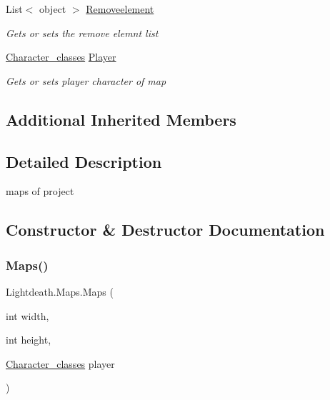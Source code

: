 \begin{DoxyCompactItemize}
List$<$ object $>$ \hyperlink{class_lightdeath_1_1_maps_af90bc1c0410dbcade8f89717f0eb478e}{Removeelement}
\begin{DoxyCompactList}\small\item\em Gets or sets the remove elemnt list \end{DoxyCompactList}\item 
\hyperlink{class_lightdeath_1_1_character__classes}{Character\+\_\+classes} \hyperlink{class_lightdeath_1_1_maps_adb2618cdaa5a0ceb621b59d963956c9d}{Player}
\begin{DoxyCompactList}\small\item\em Gets or sets player character of map \end{DoxyCompactList}\end{DoxyCompactItemize}
\subsection*{Additional Inherited Members}


\subsection{Detailed Description}
maps of project 



\subsection{Constructor \& Destructor Documentation}
\hypertarget{class_lightdeath_1_1_maps_af78c0e7d26d9d5b0ea32475e36a6ccc0}{}\label{class_lightdeath_1_1_maps_af78c0e7d26d9d5b0ea32475e36a6ccc0} 
\subsubsection{\texorpdfstring{Maps()}{Maps()}}
{\footnotesize\ttfamily Lightdeath.\+Maps.\+Maps (\begin{DoxyParamCaption}\item[{int}]{width,  }\item[{int}]{height,  }\item[{\hyperlink{class_lightdeath_1_1_character__classes}{Character\+\_\+classes}}]{player }\end{DoxyParamCaption})\hspace{0.3cm}{\ttfamily [inline]}}



